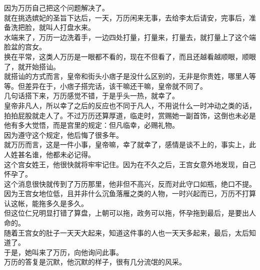 \begin{multicols}{\theparacolNo}
因为万历自己把这个问题解决了。\\

就在挑选嫔妃的圣旨下达后，一天，万历闲来无事，去给李太后请安，完事后，准备洗把脸，就叫人打盘水来。\\

水端来了，万历一边洗着手，一边四处打量，打量来，打量去，就打量上了这个端脸盆的宫女。\\

换在平常，这类人万历是一眼都不看的，现在不但看了，而且还越看越顺眼，顺眼了，就开始搭讪。\\

就搭讪的方式而言，皇帝和街头小痞子是没什么区别的，无非是你贵姓，哪里人等等。但差异在于，小痞子搭完话，该干嘛还干嘛，皇帝就不同了。\\

几句话搭下来，万历感觉不错，于是乎头一热，就幸了。\\

皇帝非凡人，所以幸了之后的反应也不同于凡人，不用说什么一时冲动之类的话，拍拍屁股就走人了。不过万历还算厚道，临走时，赏赐她一副首饰，这倒也未必是他有多大觉悟，而是宫里的规定：但凡临幸，必赐礼物。\\

因为遵守这个规定，他后悔了很多年。\\

就万历而言，这是一件小事，皇帝嘛，幸了就幸了，感情是谈不上的，事实上，此人姓甚名谁，他都未必记得。\\

这个宫女姓王，他很快就将牢牢记住。因为在不久之后，王宫女意外地发现，自己怀孕了。\\

这个消息很快就传到了万历那里，他非但不高兴，反而对此守口如瓶，绝口不提。\\

因为王宫女地位低，且并非什么沉鱼落雁之类的人物，一时兴起而已，万历不打算认这帐，能拖多久是多久。\\

但这位仁兄明显打错了算盘，上朝可以拖，政务可以拖，怀孕拖到最后，是要出人命的。\\

随着王宫女的肚子一天天大起来，知道这件事的人也一天天多起来，最后，太后知道了。\\

于是，她叫来了万历，向他询问此事。\\

万历的答复是沉默，他沉默的样子，很有几分流氓的风采。\\


\end{multicols}
